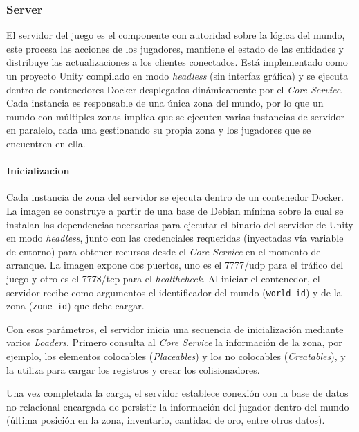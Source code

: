 \subsubsection{Server}

El servidor del juego es el componente con autoridad sobre la lógica del mundo, este procesa las acciones de los jugadores, mantiene el estado de
las entidades y distribuye las actualizaciones a los clientes conectados. Está implementado como un proyecto Unity compilado en modo
\textit{headless} (sin interfaz gráfica) y se ejecuta dentro de contenedores Docker desplegados dinámicamente por el \textit{Core Service}. Cada
instancia es responsable de una única zona del mundo, por lo que un mundo con múltiples zonas implica que se ejecuten varias instancias de servidor en paralelo, 
cada una gestionando su propia zona y los jugadores que se encuentren en ella.

\paragraph{Inicializacion}
Cada instancia de zona del servidor se ejecuta dentro de un contenedor Docker. La imagen se construye a partir de una base de Debian mínima
sobre la cual se instalan las dependencias necesarias para ejecutar el binario del servidor de Unity en modo \textit{headless},
junto con las credenciales requeridas (inyectadas vía variable de entorno) para obtener recursos desde el \textit{Core Service} en el momento del arranque.
La imagen expone dos puertos, uno es el 7777/udp para el tráfico del juego y otro es el 7778/tcp para el
\textit{healthcheck}. Al iniciar el contenedor, el servidor recibe como argumentos el identificador del mundo (\texttt{world-id}) y de la zona
 (\texttt{zone-id}) que debe cargar.

\vspace{0.25cm}

Con esos parámetros, el servidor inicia una secuencia de inicialización mediante varios \textit{Loaders}. 
Primero consulta al \textit{Core Service} la información de la zona, por ejemplo, los elementos colocables 
(\textit{Placeables}) y los no colocables (\textit{Creatables}), y la utiliza para cargar los registros y crear los colisionadores.

\vspace{0.25cm}

Una vez completada la carga, el servidor establece conexión con la base de datos no relacional encargada de persistir 
la información del jugador dentro del mundo (última posición en la zona, inventario, cantidad de oro, entre otros datos).

